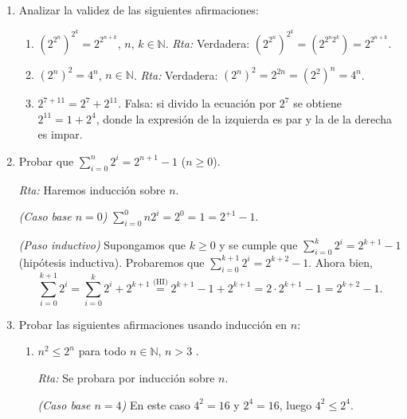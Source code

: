 \documentclass[12pt,spanish,makeidx]{amsbook}
\newcommand{\rta}{\noindent\textit{Rta: }}
\begin{document}
\begin{enumerate}
		
		
		\smallskip
		
		\item Analizar la validez de las siguientes afirmaciones:
		\begin{enumerate}
			\item  $(2^{2^n})^{2^k} = 2^{2^{n+k}}$,  $n$, $k \in {\mathbb N}$. 	\rta  Verdadera: $(2^{2^n})^{2^k} =(2^{2^n2^k}) =  2^{2^{n+k}}$.
			\item $(2^n)^2 = 4^n$, $n \in {\mathbb N}$. \rta  Verdadera: $(2^n)^2 = 2^{2n} =(2^2)^n= 4^n$.
			\item $2^{7+11} = 2^7 + 2^{11}$. Falsa: si divido la ecuación por $2^7$ se obtiene $2^{11} = 1 + 2^{4}$,  donde la expresión de la izquierda es par y la de la derecha es impar. 
		\end{enumerate}
		
		\smallskip
		
		\item\label{ej-suma-2-ala-n} Probar que $\sum_{i=0}^n 2^i = 2^{n+1} -1$ ($n \ge 0$). 
		
		\rta Haremos inducción sobre $n$. 
		
		\textit{(Caso base $n=0$) }  $\sum_{i=0}^0n 2^i = 2^0 = 1 = 2^{+1} -1$.
		
		\textit{(Paso inductivo) } Supongamos que $k\ge 0$ y se cumple que  $\sum_{i=0}^k 2^i = 2^{k+1} -1$ (hipótesis inductiva). Probaremos que  $\sum_{i=0}^{k+1} 2^i = 2^{k+2} -1$. Ahora bien, 
		\begin{equation*}
		\sum_{i=0}^{k+1} 2^i = \sum_{i=0}^{k} 2^i + 2^{k+1} \overset{\text{(HI)}}{=}  2^{k+1} -1 + 2^{k+1} = 2 \cdot 2^{k+1} -1 = 2^{k+2} -1.
		\end{equation*}
		
		
		
		\smallskip
		
		\item Probar las siguientes afirmaciones usando inducción en $n$:
		\begin{enumerate}
			\item $n^2\leq 2^n$ para todo $n\in{\mathbb N}$, $n>3$ .
			
			\rta  Se probara por inducción sobre $n$. 
			
			\textit{(Caso base $n=4$) } En  este caso $4^2 = 16$ y $2^4 = 16$, luego $4^2 \le 2^4$.
			

\end{enumerate}
\end{enumerate}
\end{document}
